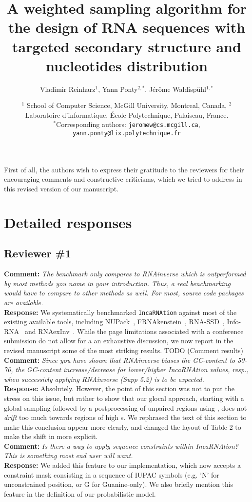 \documentclass[11pt,hyperref,draft]{article} %
\title{A weighted sampling algorithm for the design of RNA sequences with targeted secondary structure and nucleotides distribution}
\author{Vladimir Reinharz$^1$, Yann Ponty$^{2,*}$, J\'er\^{o}me Waldisp\"{u}hl$^{1,*}$}
\date{$^1$ School of Computer Science, McGill University, Montreal, Canada, $^2$ Laboratoire d'informatique, \'Ecole Polytechnique, Palaiseau, France.\\ \small $^*$Corresponding authors: \texttt{jeromew@cs.mcgill.ca}, \texttt{yann.ponty@lix.polytechnique.fr}}
\newcommand{\Answer}[1]{\noindent\textsf{\textbf{Response: }}{\sf#1}\\}
\newcommand{\Comment}[1]{\noindent\textsf{\textbf{Comment: }}{\it#1}\\[.5em]}
\begin{document}
\maketitle

First of all, the authors wish to express their gratitude to the reviewers for their encouraging comments and constructive criticisms, which we tried to address in this revised version of our manuscript.


\section{Detailed responses}

\subsection{Reviewer \#1}

\Comment{The benchmark only compares to RNAinverse which is outperformed by most methods you name in your introduction. Thus, a real benchmarking would have to compare to other methods as well. For most, source code packages are available.}
\Answer{We systematically benchmarked {\tt IncaRNAtion} against most of the existing available tools, including NUPack~\cite{Zadeh:2011fk}, FRNAkenstein~\cite{Lyngso:2012vn},  RNA-SSD~\cite{Aguirre-Hernandez:2007kx}, Info-RNA~\cite{Busch:2006uq} and RNAexInv~\cite{Avihoo:2011fk}.
While the page limitations associated with a conference submission do not allow for a an exhaustive discussion, we now report in the revised manuscript some of the most striking results. TODO (Comment results)
}

\Comment{Since you have shown that RNAinverse biases the GC-content to 50-70, the GC-content increase/decrease for lower/higher IncaRNAtion values, resp., when successivly applying RNAinverse (Supp 5.2) is to be expected.}
\Answer{Absolutely. However, the point of this section was not to put the stress on this issue, but rather to show that our glocal approach, starting with a global sampling followed by a postprocessing of unpaired regions using \RNAinverse, does not {\em drift} too much towards regions of high \GCContent{}s. We rephrased the text of this section to make this conclusion appear more clearly, and changed the layout of Table 2 to make the shift in \GC more explicit.}

\Comment{Is there a way to apply sequence constraints within IncaRNAtion? This is something most end user will want.
}
\Answer{We added this feature to our implementation, which now accepts a constraint mask consisting in a sequence of IUPAC symbols (e.g. 'N' for unconstrained position, or G for Guanine-only). We also briefly mention this feature in the definition of our probabilistic model.}
\end{document}
